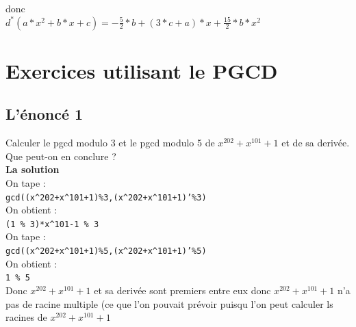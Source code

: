 \documentclass[a4paper,11pt]{book}
\begin{document}
donc \\
$d^*(a*x^2+b*x+c)=-\frac{5}{2}*b+(3*c+a)*x+\frac{15}{2}*b*x^2$

\section{Exercices utilisant le PGCD}
\subsection{L'\'enonc\'e 1}
Calculer le pgcd modulo 3 et le pgcd modulo 5 de $x^{202}+x^{101}+1$ et de sa deriv\'ee. Que peut-on en conclure ?\\
{\bf La solution}\\
On tape :\\
{\tt gcd((x\verb|^|202+x\verb|^|101+1)\%3,(x\verb|^|202+x\verb|^|101+1)'\%3)} \\
On obtient :\\
{\tt (1 \% 3)*x\verb|^|101-1 \% 3}\\
On tape :\\
{\tt gcd((x\verb|^|202+x\verb|^|101+1)\%5,(x\verb|^|202+x\verb|^|101+1)'\%5)} \\
On obtient :\\
{\tt 1 \% 5}\\
Donc $x^{202}+x^{101}+1$ et sa deriv\'ee sont premiers entre eux donc 
$x^{202}+x^{101}+1$ n'a pas de racine multiple (ce que l'on pouvait pr\'evoir 
puisqu l'on peut calculer ls racines de $x^{202}+x^{101}+1$ 
\end{document}
